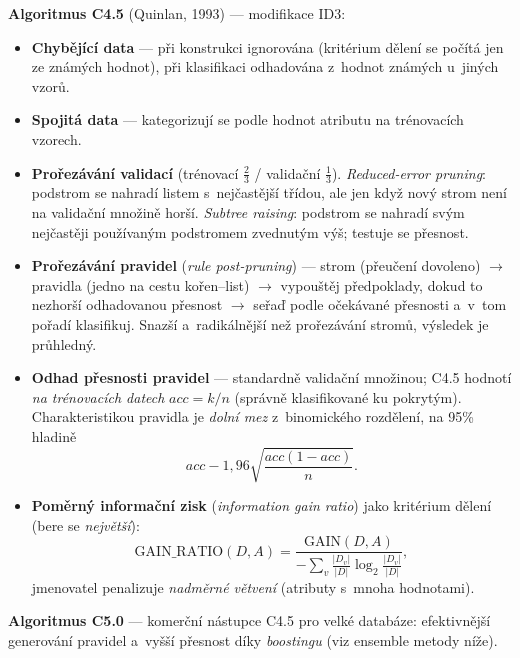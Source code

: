 \documentclass[11pt,a4paper]{article}
\theoremstyle{definition}
\begin{document}
\textbf{Algoritmus C4.5} (Quinlan, 1993) --- modifikace ID3:
\begin{itemize}
\item \textbf{Chybějící data} --- při konstrukci ignorována (kritérium dělení se počítá jen ze
      známých hodnot), při klasifikaci odhadována z~hodnot známých u~jiných vzorů.
\item \textbf{Spojitá data} --- kategorizují se podle hodnot atributu na trénovacích vzorech.
\item \textbf{Prořezávání validací} (trénovací $\tfrac23$ / validační $\tfrac13$).
      \emph{Reduced-error pruning}: podstrom se nahradí listem s~nejčastější třídou, ale jen
      když nový strom není na validační množině horší. \emph{Subtree raising}: podstrom se
      nahradí svým nejčastěji používaným podstromem zvednutým výš; testuje se přesnost.
\item \textbf{Prořezávání pravidel} (\emph{rule post-pruning}) --- strom (přeučení dovoleno)
      $\to$ pravidla (jedno na cestu kořen--list) $\to$ vypouštěj předpoklady, dokud to
      nezhorší odhadovanou přesnost $\to$ seřaď podle očekávané přesnosti a~v~tom pořadí
      klasifikuj. Snazší a~radikálnější než prořezávání stromů, výsledek je průhledný.
\item \textbf{Odhad přesnosti pravidel} --- standardně validační množinou; C4.5 hodnotí
      \emph{na trénovacích datech} $\mathit{acc}=k/n$ (správně klasifikované ku pokrytým).
      Charakteristikou pravidla je \emph{dolní mez} z~binomického rozdělení, na 95\% hladině
      \[ \mathit{acc}-1{,}96\sqrt{\frac{\mathit{acc}(1-\mathit{acc})}{n}}. \]
\item \textbf{Poměrný informační zisk} (\emph{information gain ratio}) jako kritérium dělení
      (bere se \emph{největší}):
      \[ \mathrm{GAIN\_RATIO}(D,A)=\frac{\mathrm{GAIN}(D,A)}
         {-\sum_{v}\frac{|D_v|}{|D|}\log_2\frac{|D_v|}{|D|}}, \]
      jmenovatel penalizuje \emph{nadměrné větvení} (atributy s~mnoha hodnotami).
\end{itemize}

\textbf{Algoritmus C5.0} --- komerční nástupce C4.5 pro velké databáze: efektivnější
generování pravidel a~vyšší přesnost díky \emph{boostingu} (viz ensemble metody níže).
\end{document}
